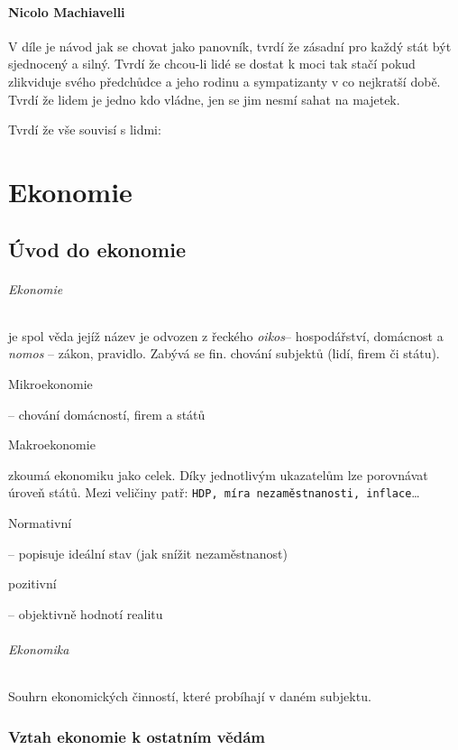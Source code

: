 \documentclass[10pt,a4paper,
twoside,%
]{report}
\begin{document}
\subsection{Nicolo Machiavelli}
V díle je návod jak se chovat jako panovník, tvrdí že zásadní pro každý stát být sjednocený a silný. Tvrdí že chcou-li lidé se dostat k moci tak stačí pokud zlikviduje svého předchůdce a jeho rodinu a sympatizanty v co nejkratší době. Tvrdí že lidem je jedno kdo vládne, jen se jim nesmí sahat na majetek. 

Tvrdí že vše souvisí s lidmi:
\emph{}


\part{Ekonomie}

\chapter{Úvod do ekonomie}


\paragraph{Ekonomie} je spol věda jejíž název je odvozen z řeckého \emph{oikos}-- hospodářství, domácnost a \emph{nomos} -- zákon, pravidlo. Zabývá se fin. chování subjektů (lidí, firem či státu).
\subparagraph{Mikroekonomie} -- chování  domácností, firem a států

\subparagraph{Makroekonomie} zkoumá ekonomiku jako celek. Díky jednotlivým ukazatelům lze porovnávat úroveň států. Mezi veličiny patř: \texttt{HDP, míra nezaměstnanosti, inflace}\dots

\subparagraph{Normativní} -- popisuje ideální stav (jak snížit nezaměstnanost)

\subparagraph{pozitivní} -- objektivně hodnotí realitu

\paragraph{Ekonomika} Souhrn ekonomických činností, které probíhají v daném subjektu.
\section{Vztah ekonomie k ostatním vědám}
\end{document}
